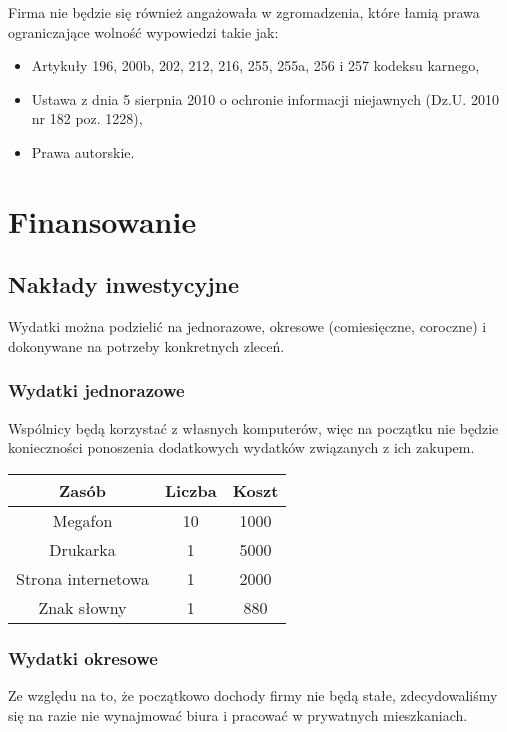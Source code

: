 \documentclass{article}
\begin{document}
Firma nie będzie się również angażowała w zgromadzenia, które łamią prawa ograniczające wolność wypowiedzi takie jak:
\begin{itemize}
\item Artykuły 196, 200b, 202, 212, 216, 255, 255a, 256 i 257 kodeksu karnego, 
\item Ustawa z dnia 5 sierpnia 2010 o ochronie informacji niejawnych (Dz.U. 2010 nr 182 poz. 1228),
\item Prawa autorskie.
\end{itemize}


\section{Finansowanie}
\subsection{Nakłady inwestycyjne}
Wydatki można podzielić na jednorazowe, okresowe (comiesięczne, coroczne) i dokonywane na potrzeby konkretnych zleceń.

\subsubsection{Wydatki jednorazowe}
Wspólnicy będą korzystać z własnych komputerów, więc na początku nie będzie konieczności ponoszenia dodatkowych wydatków związanych z ich zakupem.
\begin{table}[H]
\label{table2}
\vspace{0.3cm}
\hspace{-2cm}
\centering
\begin{tabular}{|c|c|c|}
\hline
Zasób & Liczba & Koszt \\
\hline
Megafon & 10 & 1000 \\
Drukarka & 1 & 5000 \\
Strona internetowa & 1 & 2000 \\
Znak słowny & 1 & 880 \\
\hline
\end{tabular}
\end{table}

\subsubsection{Wydatki okresowe}
Ze względu na to, że początkowo dochody firmy nie będą stałe, zdecydowaliśmy się na razie nie wynajmować biura i pracować w prywatnych mieszkaniach.
\end{document}
